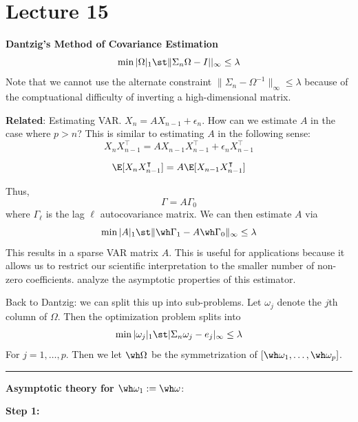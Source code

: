 \section{Lecture 15}

\textbf{Dantzig's Method of Covariance Estimation}
\[\min |\Omega|_1 \st \|\Sigma_n \Omega - I||_\infty \leq \lambda\]
Note that we cannot use the alternate constraint \(\|\Sigma_n - \Omega^{-1}\|_\infty \leq \lambda\) because of the comptuational difficulty of inverting a high-dimensional matrix.

\textbf{Related}: Estimating VAR. \(X_n = A X_{n-1} + \epsilon_n\). How can we estimate \(A\) in the case where \(p > n\)? This is similar to estimating \(A\) in the following sense:
\[X_n X_{n-1}^\intercal = A X_{n-1} X_{n-1}^\intercal + \epsilon_n X_{n-1}^\intercal\]

\[\E[X_n X_{n-1}^\intercal] = A \E[X_{n-1} X_{n-1}^\intercal]\]

Thus,
\[\Gamma = A \Gamma_0\]
where \(\Gamma_\ell\) is the lag \(\ell\) autocovariance matrix. We can then estimate \(A\) via
\[\min |A|_1 \st \|\wh\Gamma_1 - A \wh \Gamma_0\|_\infty \leq \lambda\]
This results in a sparse VAR matrix \(A\). This is useful for applications because it allows us to restrict our scientific interpretation to the smaller number of non-zero coefficients. \citet{WW16} analyze the asymptotic properties of this estimator.

Back to Dantzig: we can split this up into sub-problems. Let \(\omega_j\) denote the \(j\)th column of \(\Omega\). Then the optimization problem splits into
\[\min |\omega_j|_1 \st |\Sigma_n \omega_j - e_j|_\infty \leq \lambda\]
For \(j = 1, \dots, p\). Then we let \(\wh \Omega\) be the symmetrization of \([\wh \omega_1, \dots, \wh \omega_p]\).

\begin{center}\rule{0.5\linewidth}{0.5pt}\end{center}

\textbf{Asymptotic theory for \(\wh \omega_1 := \wh \omega\)}:

\textbf{Step 1:}

